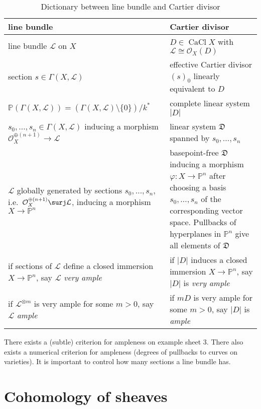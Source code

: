 \documentclass[a4paper]{article}
\renewcommand*{\P}{\mathbb{P}}
\newcommand{\sh}[1]{\mathcal{#1}} %
\DeclareMathOperator{\CaCl}{CaCl} %
\begin{document}
\begin{table}[h]
  \centering
  \begin{tabular}{p{}|p{}}
    line bundle & Cartier divisor \\ \hline
    line bundle \(\sh L\) on \(X\) & \(D \in \CaCl X\) with \(\sh L \cong \sh O_X(D)\) \\ \hline
    section \(s \in \Gamma(X, \sh L)\) & effective Cartier divisor \((s)_0\) linearly equivalent to \(D\) \\ \hline
    \(\P(\Gamma(X, \sh L)) = (\Gamma(X, \sh L) \setminus \{0\})/k^*\) & complete linear system \(|D|\) \\ \hline
    \(s_0, \dots, s_n \in \Gamma(X, \sh L)\) inducing a morphism \(\sh O_X^{\oplus (n + 1)} \to \sh L\) & linear system \(\mathfrak D\) spanned by \(s_0, \dots, s_n\) \\ \hline
    \(\sh L\) globally generated\index{globally generated} by sections \(s_0, \dots, s_n\), i.e.\ \(\sh O_X^{\oplus(n + 1)} \surj \sh L\), inducing a morphism \(X \to \P^n\) & basepoint-free \(\mathfrak D\) inducing a morphism \(\varphi: X \to \P^n\) after choosing a basis \(s_0, \dots, s_n\) of the corresponding vector space. Pullbacks of hyperplanes in \(\P^n\) give all elements of \(\mathfrak D\) \\ \hline
    if sections of \(\sh L\) define a closed immersion \(X \to \P^n\), say \(\sh L\) \emph{very ample}\index{very ample} & if \(|D|\) induces a closed immersion \(X \to \P^n\), say \(|D|\) is \emph{very ample} \\ \hline
    if \(\sh L^{\otimes m}\) is very ample for some \(m > 0\), say \(\sh L\) \emph{ample}\index{ample} & if \(mD\) is very ample for some \(m > 0\), say \(|D|\) is \emph{ample} 
  \end{tabular}
  \caption{Dictionary between line bundle and Cartier divisor}
\end{table}

\begin{remark}
  There exists a (subtle) criterion for ampleness on example sheet 3. There also exists a numerical criterion for ampleness (degrees of pullbacks to curves on varieties). It is important to control how many sections a line bundle has.
\end{remark}

\section{Cohomology of sheaves}
\end{document}
